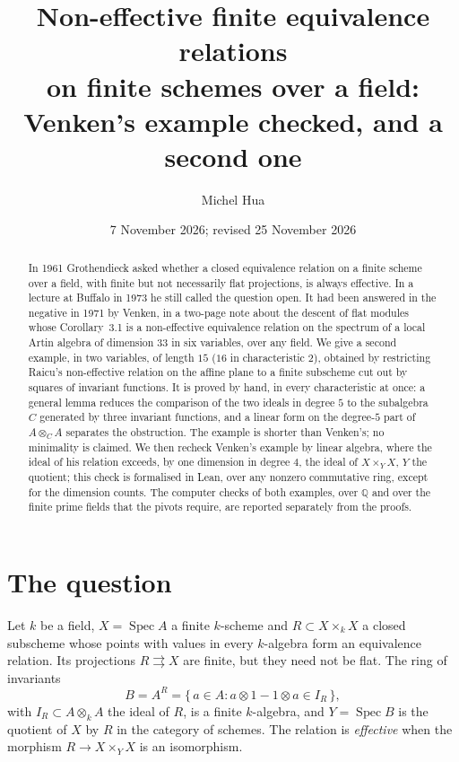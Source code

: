 \documentclass[11pt,a4paper]{amsart}
\title[Non-effective finite equivalence relations over a field]{Non-effective finite equivalence relations\\ on finite schemes over a field:\\ Venken's example checked, and a second one}
\author{Michel Hua}
\date{7 November 2026; revised 25 November 2026}
\theoremstyle{remark}
\newcommand{\Q}{\mathbb Q}
\begin{document}
\begin{abstract}
In 1961 Grothendieck asked whether a closed equivalence relation on a finite scheme over a field, with finite but not necessarily flat projections, is always effective. In a lecture at Buffalo in 1973 he still called the question open. It had been answered in the negative in 1971 by Venken, in a two-page note about the descent of flat modules whose Corollary~3.1 is a non-effective equivalence relation on the spectrum of a local Artin algebra of dimension $33$ in six variables, over any field. We give a second example, in two variables, of length $15$ ($16$ in characteristic $2$), obtained by restricting Raicu's non-effective relation on the affine plane to a finite subscheme cut out by squares of invariant functions. It is proved by hand, in every characteristic at once: a general lemma reduces the comparison of the two ideals in degree $5$ to the subalgebra $C$ generated by three invariant functions, and a linear form on the degree-$5$ part of $A \otimes_C A$ separates the obstruction. The example is shorter than Venken's; no minimality is claimed. We then recheck Venken's example by linear algebra, where the ideal of his relation exceeds, by one dimension in degree $4$, the ideal of $X \times_Y X$, $Y$ the quotient; this check is formalised in Lean, over any nonzero commutative ring, except for the dimension counts. The computer checks of both examples, over $\Q$ and over the finite prime fields that the pivots require, are reported separately from the proofs.
\end{abstract}
\maketitle

\section{The question}

Let $k$ be a field, $X = \operatorname{Spec} A$ a finite $k$-scheme and $R \subset X \times_k X$ a closed subscheme whose points with values in every $k$-algebra form an equivalence relation. Its projections $R \rightrightarrows X$ are finite, but they need not be flat. The ring of invariants
\[
B = A^R = \{\, a \in A : a \otimes 1 - 1 \otimes a \in I_R \,\},
\]
with $I_R \subset A \otimes_k A$ the ideal of $R$, is a finite $k$-algebra, and $Y = \operatorname{Spec} B$ is the quotient of $X$ by $R$ in the category of schemes. The relation is \emph{effective} when the morphism $R \to X \times_Y X$ is an isomorphism.
\end{document}
